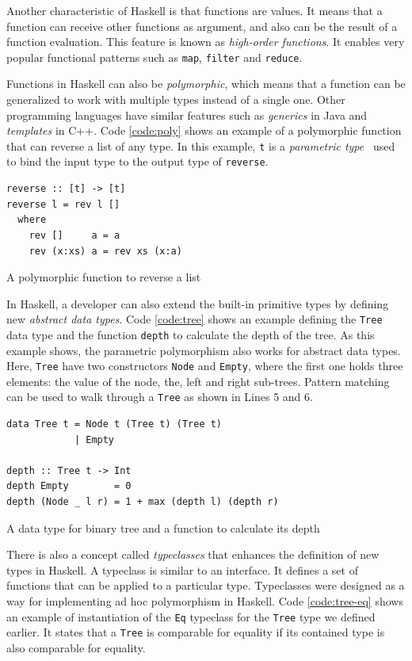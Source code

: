 Another characteristic of Haskell is that functions are values. It means that a function can receive other functions as argument, and also can be the result of a function evaluation. This feature is known as \emph{high-order functions}. It enables very popular functional patterns such as \texttt{map}, \texttt{filter} and \texttt{reduce}.

Functions in Haskell can also be \emph{polymorphic}, which means that a function can be generalized to work with multiple types instead of a single one. Other programming languages have similar features such as \emph{generics} in Java and \emph{templates} in C++. Code \ref{code:poly} shows an example of a polymorphic function that can reverse a list of any type. In this example, \texttt{t} is a \emph{parametric type}~\citep{cardelli:1985} used to bind the input type to the output type of \texttt{reverse}.

\begin{listing}
  \begin{verbatim}
reverse :: [t] -> [t]
reverse l = rev l []
  where
    rev []     a = a
    rev (x:xs) a = rev xs (x:a)
  \end{verbatim}
  \caption{A polymorphic function to reverse a list}
  \label{code:poly}
\end{listing}

In Haskell, a developer can also extend the built-in primitive types by defining new \emph{abstract data types}. Code \ref{code:tree} shows an example defining the \texttt{Tree} data type and the function \texttt{depth} to calculate the depth of the tree. As this example shows, the parametric polymorphism also works for abstract data types. Here, \texttt{Tree} have two constructors \texttt{Node} and \texttt{Empty}, where the first one holds three elements: the value of the node, the, left and right sub-trees. Pattern matching can be used to walk through a \texttt{Tree} as shown in Lines 5 and 6.

\begin{listing}
  \begin{verbatim}
data Tree t = Node t (Tree t) (Tree t)
            | Empty

depth :: Tree t -> Int
depth Empty        = 0
depth (Node _ l r) = 1 + max (depth l) (depth r)
  \end{verbatim}
  \caption{A data type for binary tree and a function to calculate its depth}
  \label{code:tree}
\end{listing}

There is also a concept called \emph{typeclasses} that enhances the definition of new types in Haskell. A typeclass is similar to an interface. It defines a set of functions that can be applied to a particular type. Typeclasses were designed as a way for implementing ad hoc polymorphism in Haskell. Code \ref{code:tree-eq} shows an example of instantiation of the \texttt{Eq} typeclass for the \texttt{Tree} type we defined earlier. It states that a \texttt{Tree} is comparable for equality if its contained type is also comparable for equality.

